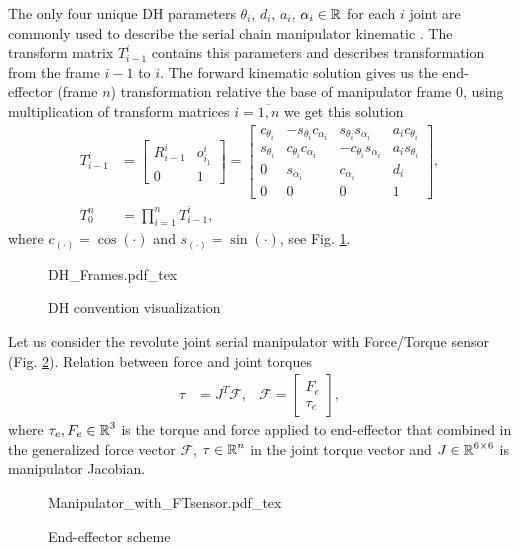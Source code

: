 The only four unique DH parameters $\theta_i$, $d_i$, $a_i$, $\alpha_i \in \operatorname{\mathbb{R}}$ for each $i$ joint are commonly used to describe the serial chain manipulator kinematic \cite{Spong}. The transform matrix $T_{i-1}^i$ contains this parameters and describes transformation from the frame $i-1$ to $i$. The forward kinematic solution gives us the end-effector (frame $n$) transformation relative the base of manipulator frame $0$, using multiplication of transform matrices $i = \overline{1, n}$ we get this solution
\begin{align}
    T_{i - 1}^i & = \begin{bmatrix}
        R_{i-1}^{i} & o_{i_1}^{i} \\
        0 & 1
    \end{bmatrix} =
    \begin{bmatrix}
        c_{\theta_i} & -s_{\theta_i}c_{\alpha_i} & s_{\theta_i}s_{\alpha_i} & a_{i}c_{\theta_i} \\
        s_{\theta_i} & c_{\theta_i}c_{\alpha_i} & -c_{\theta_i}s_{\alpha_i} & a_{i}s_{\theta_i} \\
        0 & s_{\alpha_i} & c_{\alpha_i} & d_i \\
        0 & 0 & 0 & 1
    \end{bmatrix}, \nonumber \\
    \label{eq:fk-solution}
    T_0^n & = \prod_{i=1}^n T_{i - 1}^i,
\end{align}
where $c_{(\cdot)} = \cos(\cdot)$ and $s_{(\cdot)} = \sin(\cdot)$, see Fig. \ref{fig:dh-convension}.
\begin{figure}[h!]
    \centering
    {DH_Frames.pdf_tex}
    \label{fig:dh-convension}
    \caption{DH convention visualization}
\end{figure}

Let us consider the revolute joint serial manipulator with Force/Torque sensor (Fig. \ref{fig:eef-scheme}). Relation between force and joint torques
\begin{align}
    \label{eq:ft-relation}
    \tau & = J^T \mathcal{F}, &
    \mathcal{F} = \begin{bmatrix} F_e \\ \tau_e \end{bmatrix},
\end{align}
where $\tau_e, F_e \in \operatorname{\mathbb{R}}^3$ is the torque and force applied to end-effector that combined in the generalized force vector $\mathcal{F}$, $\tau \in \operatorname{\mathbb{R}}^n$ in the joint torque vector and $J \in \operatorname{\mathbb{R}}^{6 \times 6}$ is manipulator Jacobian.
\begin{figure}[h!]
    \centering
    {Manipulator_with_FTsensor.pdf_tex}
    \label{fig:eef-scheme}
    \caption{End-effector scheme}
\end{figure}

